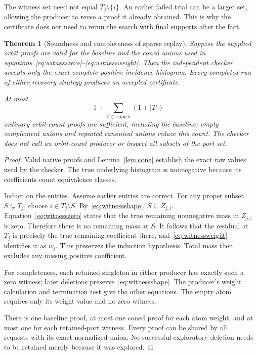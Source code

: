 \documentclass[11pt,letterpaper]{article}
\newtheorem{theorem}{Theorem}[section]
\theoremstyle{definition}\newtheorem{definition}[theorem]{Definition}
\theoremstyle{remark}\newtheorem{remark}[theorem]{Remark}
\newcommand{\supp}{\operatorname{supp}}
\begin{document}
The witness set need not equal $T_j\setminus\{i\}$. An earlier failed trial can be a larger set, allowing the producer to reuse a proof it already obtained. This is why the certificate does not need to rerun the search with final supports after the fact.

\begin{theorem}[Soundness and completeness of sparse replay]
\label{thm:certificate}
Suppose the supplied orbit proofs are valid for the baseline and the coned unions used in equations~\eqref{eq:witnesszero}--\eqref{eq:witnessweight}. Then the independent checker accepts only the exact complete positive incidence histogram. Every completed run of either recovery strategy produces an accepted certificate.

At most
\begin{equation}
1+\sum_{T\in\supp h}(1+|T|)
\label{eq:certcount}
\end{equation}
ordinary orbit-count proofs are sufficient, including the baseline; empty complement unions and repeated canonical unions reduce this count. The checker does not call an orbit-count producer or inspect all subsets of the port set.
\end{theorem}
\begin{proof}
Valid native proofs and Lemma~\ref{lem:cone} establish the exact raw values used by the checker. The true underlying histogram is nonnegative because its coefficients count equivalence classes.

Induct on the entries. Assume earlier entries are correct. For any proper subset $S\subsetneq T_j$, choose $i\in T_j\setminus S$. By~\eqref{eq:witnessshape}, $S\subseteq Z_{j,i}$. Equation~\eqref{eq:witnesszero} states that the true remaining nonnegative mass in $Z_{j,i}$ is zero. Therefore there is no remaining mass at $S$. It follows that the residual at $T_j$ is precisely the true remaining coefficient there, and~\eqref{eq:witnessweight} identifies it as $w_j$. This preserves the induction hypothesis. Total mass then excludes any missing positive coefficient.

For completeness, each retained singleton in either producer has exactly such a zero witness; later deletions preserve~\eqref{eq:witnessshape}. The producer's weight calculation and termination test give the other equations. The empty atom requires only its weight value and no zero witness.

There is one baseline proof, at most one coned proof for each atom weight, and at most one for each retained-port witness. Every proof can be shared by all requests with its exact normalized union. No successful exploratory deletion needs to be retained merely because it was explored.
\end{proof}
\end{document}
